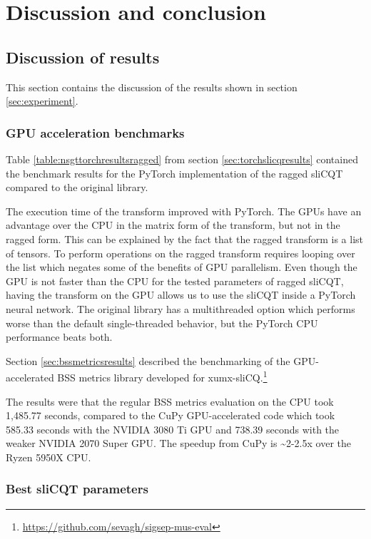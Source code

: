 \documentclass[report.tex]{subfiles}
\begin{document}

\section{Discussion and conclusion}

\subsection{Discussion of results}
\label{sec:discussion}

This section contains the discussion of the results shown in section \ref{sec:experiment}.

\subsubsection{GPU acceleration benchmarks}

Table \ref{table:nsgttorchresultsragged} from section \ref{sec:torchslicqresults} contained the benchmark results for the PyTorch implementation of the ragged sliCQT compared to the original library.

The execution time of the transform improved with PyTorch. The GPUs have an advantage over the CPU in the matrix form of the transform, but not in the ragged form. This can be explained by the fact that the ragged transform is a list of tensors. To perform operations on the ragged transform requires looping over the list which negates some of the benefits of GPU parallelism. Even though the GPU is not faster than the CPU for the tested parameters of ragged sliCQT, having the transform on the GPU allows us to use the sliCQT inside a PyTorch neural network. The original library has a multithreaded option which performs worse than the default single-threaded behavior, but the PyTorch CPU performance beats both.

Section \ref{sec:bssmetricsresults} described the benchmarking of the GPU-accelerated BSS metrics library developed for xumx-sliCQ.\footnote{\url{https://github.com/sevagh/sigsep-mus-eval}}

The results were that the regular BSS metrics evaluation on the CPU took 1,485.77 seconds, compared to the CuPy GPU-accelerated code which took 585.33 seconds with the NVIDIA 3080 Ti GPU and 738.39 seconds with the weaker NVIDIA 2070 Super GPU. The speedup from CuPy is \textasciitilde 2-2.5x over the Ryzen 5950X CPU.

\subsubsection{Best sliCQT parameters}
\end{document}
